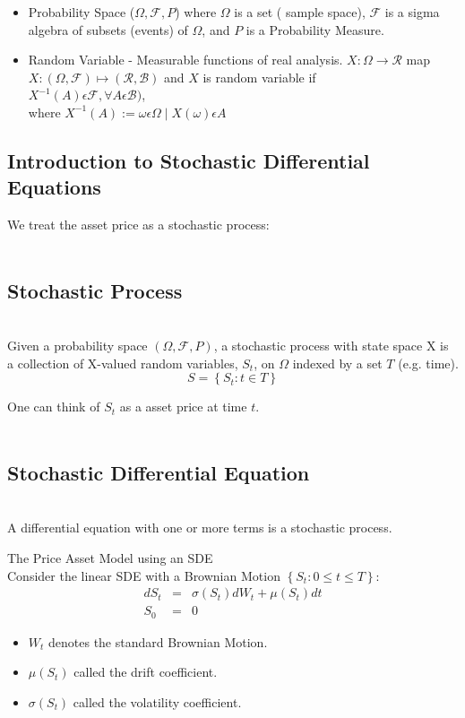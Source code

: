 \begin{itemize}
\item Probability Space ($\Omega,\mathcal{F},P$) where $\Omega$ is a set ( sample space), $\mathcal{F}$ is a sigma
algebra of subsets (events) of $\Omega$, and $P$ is a Probability Measure.
\item Random Variable - Measurable functions of real analysis.
$X:\Omega\rightarrow \mathcal{R}$ map $X : (\Omega,\mathcal{F})\mapsto (\mathcal{R}, \mathcal{B})$ and $X$ is random variable if \\
$X^{-1}(A) \epsilon \mathcal{F}, \forall A \epsilon\mathcal{B})$,\\
where $X^{-1}(A):={\omega \epsilon \Omega\mid X(\omega) \epsilon A}$
\end{itemize} 
\subsection{Introduction to Stochastic Differential Equations}
We treat the asset price as a stochastic process:\\\\
\subsection{Stochastic Process}\\
Given a probability space $\left( \Omega, \mathcal{F}, P \right) $, a stochastic process with state space X is a
collection of X-valued random variables, $S_t$, on $\Omega$ indexed by a set $T$ (e.g. time).
\begin{equation}\label{eqnModelling2-1}
S = \left\lbrace S_t : t\in T \right\rbrace 
\end{equation}

One can think of $S_t$ as a asset price at time $t$.\\\\
\subsection{Stochastic Differential Equation}\\
A differential equation with one or more terms is a stochastic process.


The Price Asset Model using an SDE\\
Consider the linear SDE with a Brownian Motion $\left\lbrace S_t: 0\leq t\leq T\right\rbrace$:
\begin{equation}\label{eqnModelling4-1}
\begin{array}{rcl}
dS_t &=& \sigma(S_t)dW_t+\mu(S_t)dt\\
S_0 &=& 0
\end{array}
\end{equation}
\begin{itemize}
\item $W_{t}$ denotes the standard Brownian Motion.
\item $\mu(S_{t})$ called the drift coefficient.
\item $\sigma(S_{t})$ called the volatility coefficient.
\end{itemize}
